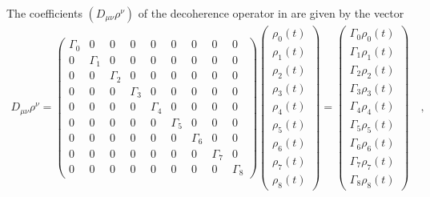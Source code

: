 %
The coefficients $(D_{\mu\nu}\rho^\nu)$ of the decoherence operator in  are given by the vector
%
\begin{align} \label{eq:deco_operator_coefficients}
    D_{\mu\nu}\rho^\nu
    = 
\begin{pmatrix}
\Gamma_0 & 0 & 0 & 0 & 0 & 0 & 0 & 0 & 0 \\
0 & \Gamma_1 & 0 & 0 & 0 & 0 & 0 & 0 & 0 \\
0 & 0 & \Gamma_2 & 0 & 0 & 0 & 0 & 0 & 0 \\
0 & 0 & 0 & \Gamma_3 & 0 & 0 & 0 & 0 & 0 \\
0 & 0 & 0 & 0 & \Gamma_4 & 0 & 0 & 0 & 0  \\
0 & 0 & 0 & 0 & 0 & \Gamma_5 & 0 & 0 & 0 \\
0 & 0 & 0 & 0 & 0 & 0 & \Gamma_6 & 0 & 0 \\
0 & 0 & 0 & 0 & 0 & 0 & 0 & \Gamma_7 & 0 \\
0 & 0 & 0 & 0 & 0 & 0 & 0 & 0 & \Gamma_8
\end{pmatrix}
%
    \begin{pmatrix}
    \rho_0(t) \\ \rho_1(t) \\ \rho_2(t) \\ \rho_3(t) \\ \rho_4(t) \\ \rho_5(t) \\ \rho_6(t) \\ \rho_7(t) \\ \rho_8(t)    
    \end{pmatrix}
    =
    \begin{pmatrix}
    \Gamma_0 \rho_0(t) \\ \Gamma_1 \rho_1(t) \\ \Gamma_2 \rho_2(t) \\ \Gamma_3 \rho_3(t) \\ \Gamma_4 \rho_4(t) \\ \Gamma_5 \rho_5(t) \\ \Gamma_6 \rho_6(t) \\ \Gamma_7 \rho_7(t) \\ \Gamma_8 \rho_8(t)   
    \end{pmatrix}
    \quad \text{,}
\end{align}
%


